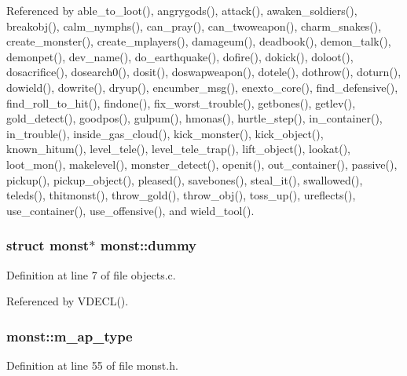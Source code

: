 Referenced by able\+\_\+to\+\_\+loot(), angrygods(), attack(), awaken\+\_\+soldiers(), breakobj(), calm\+\_\+nymphs(), can\+\_\+pray(), can\+\_\+twoweapon(), charm\+\_\+snakes(), create\+\_\+monster(), create\+\_\+mplayers(), damageum(), deadbook(), demon\+\_\+talk(), demonpet(), dev\+\_\+name(), do\+\_\+earthquake(), dofire(), dokick(), doloot(), dosacrifice(), dosearch0(), dosit(), doswapweapon(), dotele(), dothrow(), doturn(), dowield(), dowrite(), dryup(), encumber\+\_\+msg(), enexto\+\_\+core(), find\+\_\+defensive(), find\+\_\+roll\+\_\+to\+\_\+hit(), findone(), fix\+\_\+worst\+\_\+trouble(), getbones(), getlev(), gold\+\_\+detect(), goodpos(), gulpum(), hmonas(), hurtle\+\_\+step(), in\+\_\+container(), in\+\_\+trouble(), inside\+\_\+gas\+\_\+cloud(), kick\+\_\+monster(), kick\+\_\+object(), known\+\_\+hitum(), level\+\_\+tele(), level\+\_\+tele\+\_\+trap(), lift\+\_\+object(), lookat(), loot\+\_\+mon(), makelevel(), monster\+\_\+detect(), openit(), out\+\_\+container(), passive(), pickup(), pickup\+\_\+object(), pleased(), savebones(), steal\+\_\+it(), swallowed(), teleds(), thitmonst(), throw\+\_\+gold(), throw\+\_\+obj(), toss\+\_\+up(), ureflects(), use\+\_\+container(), use\+\_\+offensive(), and wield\+\_\+tool().

\hypertarget{structmonst_a10134cb1897b4ccd2d51aba7bae60c50}{
\subsubsection[{dummy}]{\setlength{\rightskip}{0pt plus 5cm}struct {\bf monst}$\ast$ monst\+::dummy}}\label{structmonst_a10134cb1897b4ccd2d51aba7bae60c50}


Definition at line 7 of file objects.\+c.



Referenced by V\+D\+E\+C\+L().

\hypertarget{structmonst_aab8fc9a0be90b4db8333b09487e2620c}{
\subsubsection[{m\+\_\+ap\+\_\+type}]{ monst\+::m\+\_\+ap\+\_\+type}}\label{structmonst_aab8fc9a0be90b4db8333b09487e2620c}


Definition at line 55 of file monst.\+h.



